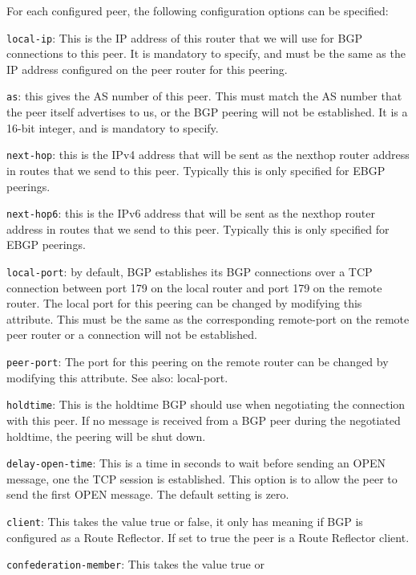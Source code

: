 \begin{description}
  For each configured {\stt peer}, the following
  configuration options can be specified:
\begin{description}
\item{\tt local-ip}: This is the IP address of this router that we
  will use for BGP connections to this peer.  It is mandatory to
  specify, and must be the same as the IP address configured on the
  peer router for this peering.
\item{\tt as}: this gives the AS number of this peer.  This must match
  the AS number that the peer itself advertises to us, or the BGP
  peering will not be established.  It is a 16-bit integer, and is
  mandatory to specify.
\item{\tt next-hop}: this is the IPv4 address that will be sent as the
  nexthop router address in routes that we send to this peer.
  Typically this is only specified for EBGP peerings.
\item{\tt next-hop6}: this is the IPv6 address that will be sent as the
  nexthop router address in routes that we send to this peer.
  Typically this is only specified for EBGP peerings.
\item{\tt local-port}: by default, BGP establishes its BGP connections
  over a TCP connection between port 179 on the local router and port
  179 on the remote router.  The local port for this peering can be
  changed by modifying this attribute.  This must be the same as the
  corresponding {\stt remote-port} on the remote peer router or a
  connection will not be established.
\item{\tt peer-port}: The port for this peering on the remote router
  can be changed by modifying this attribute. See also: {\stt
  local-port}.
\item{\tt holdtime}: This is the holdtime BGP should use when
  negotiating the connection with this peer.  If no message is
  received from a BGP peer during the negotiated holdtime, the
  peering will be shut down.
\item{\tt delay-open-time}: This is a time in seconds to wait before
sending an OPEN message, one the TCP session is established. This
option is to allow the peer to send the first OPEN message. The
default setting is zero.
\item{\tt client}: This takes the value {\stt true} or {\stt false},
it only has meaning if BGP is configured as a Route Reflector. If set
to {\stt true} the peer is a Route Reflector client.
\item{\tt confederation-member}: This takes the value {\stt true} or

\end{description}
\end{description}

